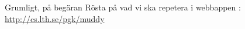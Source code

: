 
\begin{Slide}{Grumligt, på begäran}
Rösta på vad vi ska repetera i webbappen :
\url{http://cs.lth.se/pgk/muddy}
\end{Slide}

%
%
%
%
%

